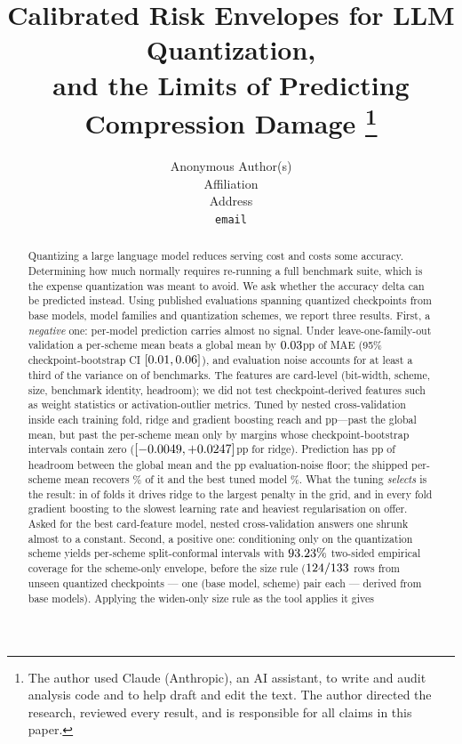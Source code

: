 \documentclass{article}
\title{Calibrated Risk Envelopes for LLM Quantization,\\
and the Limits of Predicting Compression Damage%
\thanks{The author used Claude (Anthropic), an AI assistant, to write and audit analysis code and to help draft and edit the text. The author directed the research, reviewed every result, and is responsible for all claims in this paper.}}
\author{%
  Anonymous Author(s) \\
  Affiliation \\
  Address \\
  \texttt{email} \\
}
\begin{document}
\maketitle

\begin{abstract}
\noindent
Quantizing a large language model reduces serving cost and costs some accuracy.
Determining how much normally requires re-running a full benchmark suite, which
is the expense quantization was meant to avoid. We ask whether the accuracy
delta can be predicted instead. Using \Nrows{} published evaluations spanning
\NQuantCkpt{} quantized checkpoints from \NBase{} base models, \Nfam{} model
families and \Nsch{} quantization schemes, we report three results. First, a \emph{negative} one: per-model
prediction carries almost no signal. Under leave-one-family-out validation a
per-scheme mean beats a global mean by \(0.03\)pp of MAE (95\%
checkpoint-bootstrap CI \([0.01, 0.06]\)), and evaluation noise
accounts for at least a third of the variance on \NoiseNThird{} of
\NoiseNBench{} benchmarks. The features are card-level (bit-width, scheme,
size, benchmark identity, headroom); we did not test checkpoint-derived
features such as weight statistics or activation-outlier metrics. Tuned by
nested cross-validation inside each training fold, ridge and gradient boosting
reach \MaeRidgeTuned{} and \MaeGradboostTuned{}pp---past the global mean, but
past the per-scheme mean only by margins whose checkpoint-bootstrap intervals
contain zero (\([-0.0049, +0.0247]\)pp for ridge).
Prediction has \HeadroomPp{}pp of headroom between the global mean and the
\MaeFloor{}pp evaluation-noise floor; the shipped per-scheme mean recovers
\SchemeHeadroomPct{}\% of it and the best tuned model
\PredBestHeadroomPct{}\%. What the tuning \emph{selects} is the result: in
\TuneRidgeFoldsEdge{} of \TuneOuterFolds{} folds it drives ridge to the
largest penalty in the grid, and in every fold gradient boosting to the
slowest learning rate and heaviest regularisation on offer. Asked for the best
card-feature model, nested cross-validation answers one shrunk almost to a
constant.
Second, a positive one: conditioning only on the quantization scheme yields
per-scheme split-conformal intervals with \(93.23\%\) two-sided
empirical coverage for the scheme-only envelope, before the size rule
(\(124/133\) rows from \ProspClusN{} unseen quantized
checkpoints --- one (base model, scheme) pair each --- derived from
\ProspBases{} base models). Applying the widen-only size rule as the tool applies it gives

\end{abstract}
\end{document}
